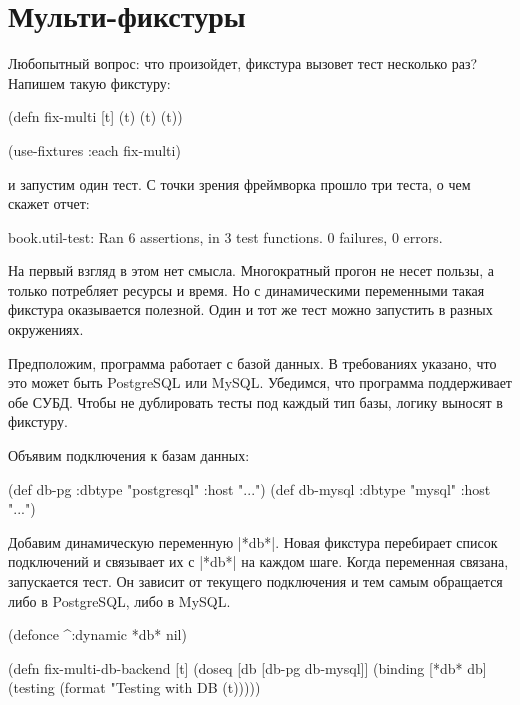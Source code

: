 \section{Мульти-фикстуры}

Любопытный вопрос: что произойдет, фикстура вызовет тест несколько раз? Напишем
такую фикстуру:

\begin{english}
  \begin{clojure}
(defn fix-multi [t]
  (t) (t) (t))

(use-fixtures :each fix-multi)
  \end{clojure}
\end{english}

\noindent
и запустим один тест. С точки зрения фреймворка прошло три теста, о чем скажет
отчет:

\begin{english}
  \begin{text}
book.util-test: Ran 6 assertions, in 3 test functions. 0 failures, 0 errors.
  \end{text}
\end{english}

На первый взгляд в этом нет смысла. Многократный прогон не несет пользы, а
только потребляет ресурсы и время. Но с динамическими переменными такая фикстура
оказывается полезной. Один и тот же тест можно запустить в разных окружениях.

Предположим, программа работает с базой данных. В требованиях указано, что это
может быть PostgreSQL или MySQL. Убедимся, что программа поддерживает обе
СУБД. Чтобы не дублировать тесты под каждый тип базы, логику выносят в фикстуру.

Объявим подключения к базам данных:

\begin{english}
  \begin{clojure}
(def db-pg {:dbtype "postgresql" :host "..."})
(def db-mysql {:dbtype "mysql" :host "..."})
  \end{clojure}
\end{english}

Добавим динамическую переменную \spverb|*db*|. Новая фикстура перебирает список
подключений и связывает их с \spverb|*db*| на каждом шаге. Когда переменная
связана, запускается тест. Он зависит от текущего подключения и тем самым
обращается либо в PostgreSQL, либо в MySQL.

\begin{english}
  \begin{clojure}
(defonce ^:dynamic *db* nil)

(defn fix-multi-db-backend [t]
  (doseq [db [db-pg db-mysql]]
    (binding [*db* db]
      (testing (format "Testing with DB %
        (t)))))
  \end{clojure}
\end{english}

